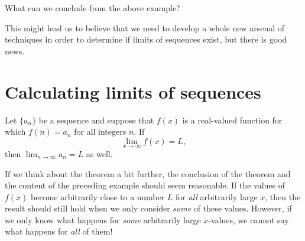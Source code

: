 \documentclass{ximera}
\begin{document}
What can we conclude from the above example?

\begin{multipleChoice}
\end{multipleChoice}

This might lead us to believe that we need to develop a whole new arsenal of techniques in order to determine if limits of sequences exist, but there is good news.

\section{Calculating limits of sequences}

\begin{theorem}
  Let $\{a_n\}$ be a sequence and suppose that $f(x)$ is a real-valued function for which $f(n) = a_n$ for all integers $n$.  If
  \[
  \lim_{x\to\infty}f(x)=L,
  \]
  then $\lim_{n\to\infty} a_n=L$ as well.
\end{theorem}

If we think about the theorem a bit further, the conclusion  of the theorem and the content of the preceding example should seem reasonable.  If the values of $f(x)$ become arbitrarily close to a number $L$ for \emph{all} arbitrarily large $x$, then the result should still hold when we only consider \emph{some} of these values.  However, if we only know what happens for \emph{some} arbitrarily large $x$-values, we cannot say what happens for \emph{all} of them!

%

\end{document}

